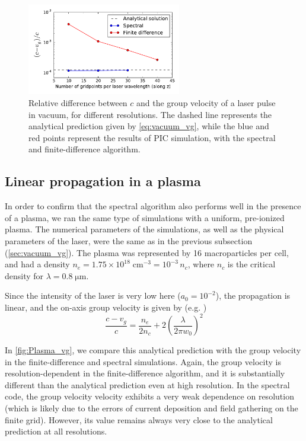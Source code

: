 \documentclass[1p,times]{elsarticle}
\begin{document}
\begin{figure}[!h]
\centering
\includegraphics[width=0.6\textwidth]{figures/Vacuum_vg.pdf}
\caption{\label{fig:Vacuum_vg}Relative difference between $c$ and the
group velocity of a laser pulse in vacuum, for different resolutions. The dashed line represents
the analytical prediction given by \cref{eq:vacuum_vg}, while the blue
and red points represent the results of PIC simulation, with the
spectral and finite-difference algorithm.}
\end{figure}


\subsection{Linear propagation in a plasma}
\label{sec:linear_plasma}

In order to confirm that the spectral algorithm also performs well in
the presence of a plasma, we ran the same type of simulations with a
uniform, pre-ionized plasma. The numerical parameters of the
simulations, as well as the physical parameters of the laser, 
were the same as in the previous subsection
(\cref{sec:vacuum_vg}). The plasma was represented by 16
macroparticles per cell, and had a density $n_e = 1.75\times
10^{18}\;\mathrm{cm}^{-3} = 10^{-3}\,n_c$, where $n_c$ is the critical
density for $\lambda=0.8\;\mathrm{\mu m}$.

Since the intensity of the laser is very low here ($a_0 = 10^{-2}$),
the propagation is linear, and the on-axis group velocity is given by
(e.g. \citep{Esarey1999})
\begin{equation} 
\label{eq:plasma_vg}
\frac{c-v_g}{c} = \frac{n_e}{2n_c} + 2\left( \frac{\lambda}{2\pi w_0} \right)^2
\end{equation}

In \cref{fig:Plasma_vg}, we compare this analytical prediction with the group velocity in the
finite-difference and spectral simulations. Again, the
group velocity is resolution-dependent in the finite-difference
algorithm, and it is substantially different than the analytical
prediction even at high resolution. In the spectral code, the group
velocity velocity exhibits a very weak dependence on resolution
(which is likely due to the errors of current deposition and field
gathering on the finite grid). However, its value remains always very
close to the analytical prediction at all resolutions.
\end{document}

